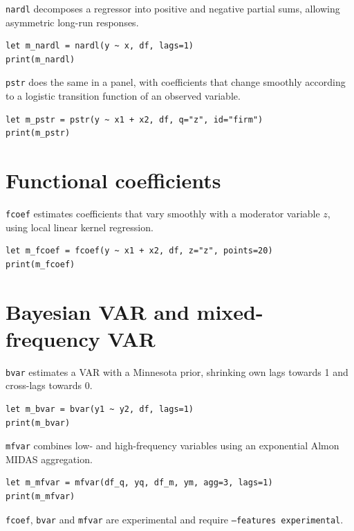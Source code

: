 \texttt{nardl} decomposes a regressor into positive and negative partial sums,
allowing asymmetric long-run responses.

\begin{lstlisting}[caption={NARDL}]
let m_nardl = nardl(y ~ x, df, lags=1)
print(m_nardl)
\end{lstlisting}

\texttt{pstr} does the same in a panel, with coefficients that change smoothly
according to a logistic transition function of an observed variable.

\begin{lstlisting}[caption={Panel Smooth Transition Regression}]
let m_pstr = pstr(y ~ x1 + x2, df, q="z", id="firm")
print(m_pstr)
\end{lstlisting}

\section{Functional coefficients}

\texttt{fcoef} estimates coefficients that vary smoothly with a moderator
variable $z$, using local linear kernel regression.

\begin{lstlisting}[caption={Functional coefficient model}]
let m_fcoef = fcoef(y ~ x1 + x2, df, z="z", points=20)
print(m_fcoef)
\end{lstlisting}

\section{Bayesian VAR and mixed-frequency VAR}

\texttt{bvar} estimates a VAR with a Minnesota prior, shrinking own lags
towards 1 and cross-lags towards 0.

\begin{lstlisting}[caption={Bayesian VAR}]
let m_bvar = bvar(y1 ~ y2, df, lags=1)
print(m_bvar)
\end{lstlisting}

\texttt{mfvar} combines low- and high-frequency variables using an exponential
Almon MIDAS aggregation.

\begin{lstlisting}[caption={Mixed-frequency VAR}]
let m_mfvar = mfvar(df_q, yq, df_m, ym, agg=3, lags=1)
print(m_mfvar)
\end{lstlisting}

\texttt{fcoef}, \texttt{bvar} and \texttt{mfvar} are experimental and
require \texttt{--features experimental}.

